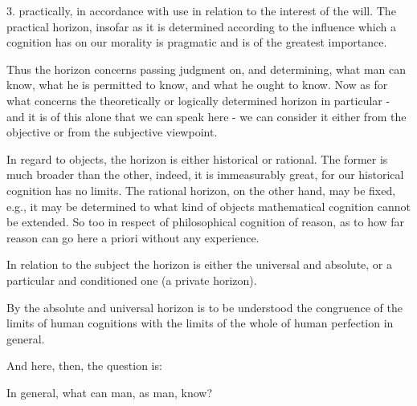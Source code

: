 3. practically, in accordance with use in relation to the interest of the will.
The practical horizon, insofar as it is determined according to the influence
which a cognition has on our morality is pragmatic and is of the greatest importance.

Thus the horizon concerns passing judgment on, and determining,
what man can know, what he is permitted to know, and what he ought to know.
Now as for what concerns the theoretically or logically determined horizon
in particular - and it is of this alone that we can speak here - we can
consider it either from the objective or from the subjective viewpoint.

In regard to objects, the horizon is either historical or rational.
The former is much broader than the other, indeed, it is immeasurably great,
for our historical cognition has no limits.
The rational horizon, on the other hand, may be fixed,
e.g., it may be determined to what kind of objects
mathematical cognition cannot be extended.
So too in respect of philosophical cognition of reason,
as to how far reason can go here a priori without any experience.

In relation to the subject the horizon is either the universal and absolute,
or a particular and conditioned one (a private horizon).

By the absolute and universal horizon is to be understood
the congruence of the limits of human cognitions with
the limits of the whole of human perfection in general.

And here, then, the question is:

In general, what can man, as man, know?

